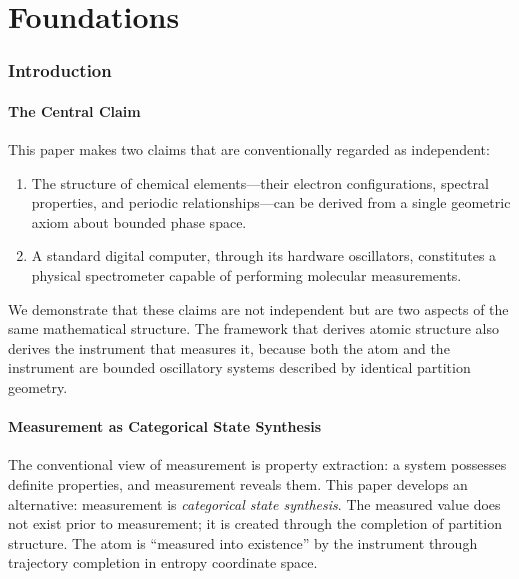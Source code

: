 \documentclass[11pt,a4paper]{article}
\theoremstyle{definition}
\theoremstyle{remark}
\begin{document}
\tableofcontents
\newpage


\part{Foundations}

\section{Introduction}
\label{sec:introduction}

\subsection{The Central Claim}

This paper makes two claims that are conventionally regarded as independent:

\begin{enumerate}
\item The structure of chemical elements---their electron configurations, spectral properties, and periodic relationships---can be derived from a single geometric axiom about bounded phase space.
\item A standard digital computer, through its hardware oscillators, constitutes a physical spectrometer capable of performing molecular measurements.
\end{enumerate}

We demonstrate that these claims are not independent but are two aspects of the same mathematical structure. The framework that derives atomic structure also derives the instrument that measures it, because both the atom and the instrument are bounded oscillatory systems described by identical partition geometry.

\subsection{Measurement as Categorical State Synthesis}

The conventional view of measurement is property extraction: a system possesses definite properties, and measurement reveals them. This paper develops an alternative: measurement is \emph{categorical state synthesis}. The measured value does not exist prior to measurement; it is created through the completion of partition structure. The atom is ``measured into existence'' by the instrument through trajectory completion in entropy coordinate space.
\end{document}
